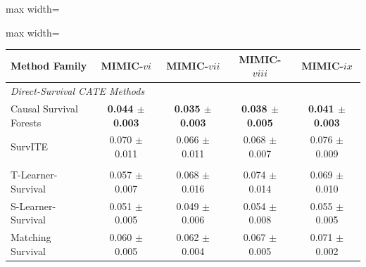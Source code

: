 \begin{table}[htbp]
{        \par\noindent\begin{adjustbox}{max width=\linewidth}\begin{minipage}[c]{\linewidth}
        \centering
        \begin{adjustbox}{max width=\linewidth}\begin{tabular}{lcccc}
        \toprule
        \textbf{Method Family} & \textbf{MIMIC-$vi$} & \textbf{MIMIC-$vii$} & \textbf{MIMIC-$viii$} & \textbf{MIMIC-$ix$} \\
        \midrule
        \multicolumn{5}{l}{\textit{Direct-Survival CATE Methods}} \\
                Causal Survival Forests & \textbf{0.044 $\pm$ 0.003} & \textbf{0.035 $\pm$ 0.003} & \textbf{0.038 $\pm$ 0.005} & \textbf{0.041 $\pm$ 0.003} \\ 
                SurvITE & 0.070 $\pm$ 0.011 & 0.066 $\pm$ 0.011 & 0.068 $\pm$ 0.007 & 0.076 $\pm$ 0.009 \\ 
        \addlinespace
        \multicolumn{5}{l}{\textit{Survival Meta-Learners}} \\
                T-Learner-Survival & 0.057 $\pm$ 0.007 & 0.068 $\pm$ 0.016 & 0.074 $\pm$ 0.014 & 0.069 $\pm$ 0.010 \\ 
                S-Learner-Survival & 0.051 $\pm$ 0.005 & 0.049 $\pm$ 0.006 & 0.054 $\pm$ 0.008 & 0.055 $\pm$ 0.005 \\ 
                Matching Survival & 0.060 $\pm$ 0.005 & 0.062 $\pm$ 0.004 & 0.067 $\pm$ 0.005 & 0.071 $\pm$ 0.002 \\ 
        \bottomrule
        \end{tabular}\end{adjustbox}
        \end{minipage}\end{adjustbox}\par
}
\end{table}